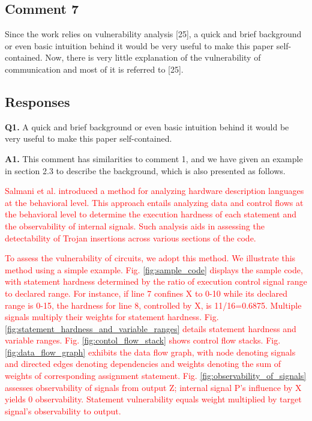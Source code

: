 \documentclass[10pt,journal, compsoc]{IEEEtran}
\begin{document}
\subsection*{Comment 7}%
Since the work relies on vulnerability analysis [25], a quick and brief background or even basic intuition behind it would be very useful to make this paper self-contained. Now, there is very little explanation of the vulnerability of communication and most of it is referred to [25].

\subsection*{Responses}

\textbf{Q1.} A quick and brief background or even basic intuition behind it would be very useful to make this paper self-contained.

\vspace*{1em}

\textbf{A1.} This comment has similarities to comment 1, and we have given an example in section 2.3 to describe the background, which is also presented as follows.

\textcolor{red}{Salmani et al. \cite{conference:HS} introduced a method for analyzing hardware description languages at the behavioral level. This approach entails analyzing data and control flows at the behavioral level to determine the execution hardness of each statement and the observability of internal signals. Such analysis aids in assessing the detectability of Trojan insertions across various sections of the code.}

\textcolor{red}{To assess the vulnerability of circuits, we adopt this method. We illustrate this method using a simple example. Fig. \ref{fig:sample_code} displays the sample code, with statement hardness determined by the ratio of execution control signal range to declared range. For instance, if line 7 confines X to 0-10 while its declared range is 0-15, the hardness for line 8, controlled by X, is 11/16=0.6875. Multiple signals multiply their weights for statement hardness. Fig. \ref{fig:statement_hardness_and_variable_ranges} details statement hardness and variable ranges. Fig. \ref{fig:contol_flow_stack} shows control flow stacks. Fig. \ref{fig:data_flow_graph} exhibits the data flow graph, with node denoting signals and directed edges denoting dependencies and weights denoting the sum of weights of corresponding assignment statement. Fig. \ref{fig:observability_of_signals} assesses observability of signals from output Z; internal signal P's influence by X yields 0 observability. Statement vulnerability equals weight multiplied by target signal's observability to output.}
\end{document}
